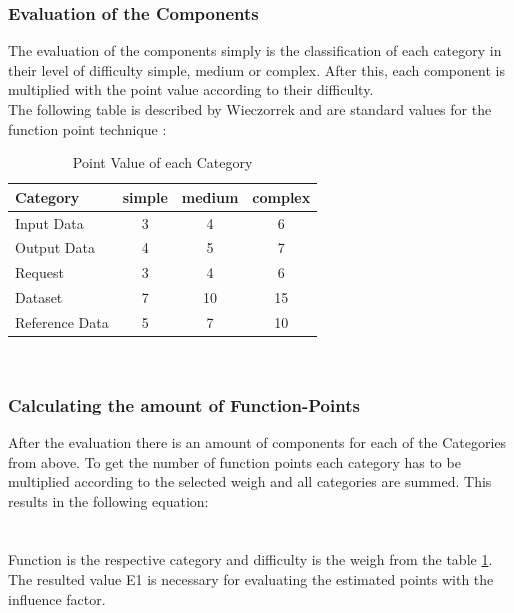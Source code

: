 \subsubsection{Evaluation of the Components}

The evaluation of the components simply is the classification of each category in their level of difficulty simple, medium or complex. After this, each component is multiplied with the point value according to their difficulty. \\
The following table is described by Wieczorrek and are standard values for the function point technique \cite{fpafundamentals}:\\
\begin{table}[h] 
	\centering 
	\setlength{\tabcolsep}{4pt}
	\begin{tabular}{|l||c|c|c|}\hline
		Category & simple & medium & complex \\ \hline\hline
		Input Data & 3 & 4 & 6\\ \hline
		Output Data & 4 & 5 & 7\\ \hline
		Request & 3 & 4 & 6\\ \hline
		Dataset & 7 & 10 & 15\\ \hline
		Reference Data & 5 & 7 & 10\\ \hline
	\end{tabular}
	\caption{Point Value of each Category} 
	\label{tab:pointvalues} 
\end{table} \\

\subsubsection{ Calculating the amount of Function-Points}

After the evaluation there is an amount of components for each of the Categories from above. To get the number of function points each category has to be multiplied according to the selected weigh and all categories are summed. This results in the following equation:\\

\\
\\
Function is the respective category and difficulty is the weigh from the table \ref{tab:pointvalues}. The resulted value E1 is necessary for evaluating the estimated points with the influence factor.

